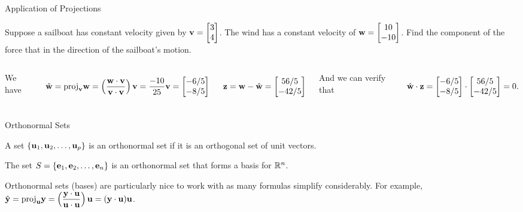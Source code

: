 \documentclass[xcolor=dvipsnames,aspectratio=169,t]{beamer}
\begin{document}
\begin{frame}{Application of Projections}

\begin{example}
Suppose a sailboat has constant velocity given by $\mathbf{v} = \begin{bmatrix} 3 \\ 4 \end{bmatrix}$. The wind has a constant velocity of $\mathbf{w} = \begin{bmatrix} 10 \\ -10 \end{bmatrix}$. Find the component of the force that in the direction of the sailboat's motion.
\end{example} 

\pause
\begin{columns}[T]

\column{0.5\tw}

We have 

\[ \hat{\mathbf{w}} =  \mbox{proj}_{\mathbf{v}} \mathbf{w} =  \left( \frac{\mathbf{w} \cdot \mathbf{v}}{\mathbf{v} \cdot \mathbf{v}} \right) \mathbf{v} = \frac{-10}{25} \mathbf{v} =\begin{bmatrix}  -6/5 \\ -8/5 \end{bmatrix} \]

\[ \mathbf{z} = \mathbf{w} - \hat{\mathbf{w}} = \begin{bmatrix} 56/5 \\  -42/5 \end{bmatrix} \]

\column{0.5\tw}

And we can verify that

\[ \hat{\mathbf{w}} \cdot \mathbf{z} = \begin{bmatrix}  -6/5 \\ -8/5 \end{bmatrix} \cdot \begin{bmatrix} 56/5 \\  -42/5 \end{bmatrix} =  0 .\]

\end{columns}
\end{frame}


\begin{frame}{Orthonormal Sets}
  \medskip

  \begin{definition}
  A set $\left\{ \mathbf{u}_1, \mathbf{u}_2, \ldots , \mathbf{u}_p \right\}$ is an \alert{orthonormal set} if it is an orthogonal set of \alert{unit} vectors.
  \end{definition}
  \medskip

  \begin{example}
    The set $S = \left\{ \mathbf{e}_1,\mathbf{e}_2,\ldots,\mathbf{e}_n \right\}$ is an orthonormal set that forms a basis for $\mathbb{R}^n$.
  \end{example}
  \medskip

  \bi
  \ii Orthonormal sets (bases) are particularly nice to work with as many formulas simplify considerably.
  \ii For example, $\displaystyle \hat{\mathbf{y}} =  \mbox{proj}_{\mathbf{u}} \mathbf{y} =  \left( \frac{\mathbf{y} \cdot \mathbf{u}}{\mathbf{u} \cdot \mathbf{u}} \right) \mathbf{u} = (\mathbf{y} \cdot \mathbf{u}) \mathbf{u}$.
  \ei
\end{frame}
\end{document}
